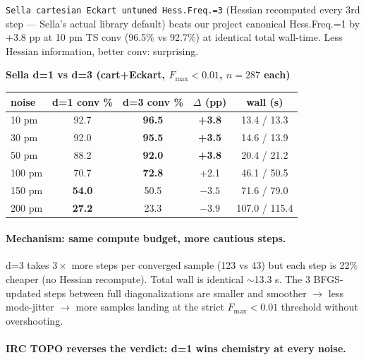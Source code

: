 \documentclass[11pt]{article}
\begin{document}
\texttt{Sella cartesian Eckart untuned Hess.Freq.=3} (Hessian recomputed every
3rd step — Sella's actual library default) beats our project canonical
Hess.Freq.=1 by +3.8 pp at 10 pm TS conv (96.5\% vs 92.7\%) at identical
total wall-time. Less Hessian information, better conv: surprising.

\begin{center}\small
\textbf{Sella d=1 vs d=3 (cart+Eckart, $F_\mathrm{max}<0.01$, $n=287$ each)}\\[0.4em]
\begin{tabular}{l|cccc}
\toprule
\textbf{noise} & \textbf{d=1 conv \%} & \textbf{d=3 conv \%} & $\Delta$ \textbf{(pp)} & \textbf{wall (s)} \\
\midrule
10 pm  & 92.7 & \textbf{96.5} & \textbf{+3.8} & 13.4 / 13.3 \\
30 pm  & 92.0 & \textbf{95.5} & \textbf{+3.5} & 14.6 / 13.9 \\
50 pm  & 88.2 & \textbf{92.0} & \textbf{+3.8} & 20.4 / 21.2 \\
100 pm & 70.7 & \textbf{72.8} & +2.1          & 46.1 / 50.5 \\
150 pm & \textbf{54.0} & 50.5 & $-3.5$        & 71.6 / 79.0 \\
200 pm & \textbf{27.2} & 23.3 & $-3.9$ & 107.0 / 115.4 \\
\bottomrule
\end{tabular}
\end{center}

\paragraph{Mechanism: same compute budget, more cautious steps.} d=3 takes
$3\times$ more steps per converged sample (123 vs 43) but each step is 22\%
cheaper (no Hessian recompute). Total wall is identical $\sim$13.3 s. The
3 BFGS-updated steps between full diagonalizations are smaller and smoother
$\to$ less mode-jitter $\to$ more samples landing at the strict
$F_\mathrm{max}<0.01$ threshold without overshooting.

\paragraph{IRC TOPO reverses the verdict: d=1 wins chemistry at every noise.}
\end{document}
